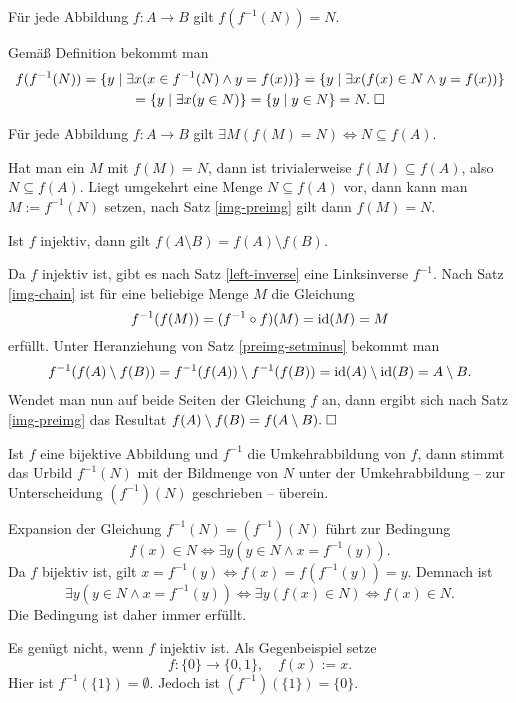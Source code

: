 \begin{Satz}\label{img-preimg}
Für jede Abbildung $f\colon A\to B$ gilt $f(f^{-1}(N))=N$.
\end{Satz}
\begin{Beweis}
Gemäß Definition bekommt man
\begin{gather*}
f(f^{-1}(N))
= \{y\mid \exists x(x\in f^{-1}(N)\land y=f(x))\}
= \{y\mid \exists x(f(x)\in N\land y=f(x))\}\\
= \{y\mid \exists x(y\in N)\} = \{y\mid y\in N\} = N.\;\square
\end{gather*}
\end{Beweis}

\begin{Satz}
Für jede Abbildung $f\colon A\to B$ gilt
$\exists M(f(M)=N)\iff N\subseteq f(A)$.
\end{Satz}
\begin{Beweis}
Hat man ein $M$ mit $f(M)=N$, dann ist trivialerweise
$f(M)\subseteq f(A)$, also $N\subseteq f(A)$. Liegt umgekehrt
eine Menge $N\subseteq f(A)$ vor, dann kann man $M:=f^{-1}(N)$
setzen, nach Satz \ref{img-preimg} gilt dann $f(M)=N$.\;\qedsymbol
\end{Beweis}

\begin{Satz}\label{inj-img-setminus}
Ist $f$ injektiv, dann gilt $f(A\setminus B)=f(A)\setminus f(B)$.
\end{Satz}
\begin{Beweis}
Da $f$ injektiv ist, gibt es nach Satz \ref{left-inverse} eine
Linksinverse $f^{-1}$. Nach Satz \ref{img-chain} ist für eine
beliebige Menge $M$ die Gleichung
\[f^{-1}(f(M)) = (f^{-1}\circ f)(M) = \operatorname{id}(M) = M\]
erfüllt. Unter Heranziehung von Satz \ref{preimg-setminus}
bekommt man
\begin{gather*}
f^{-1}(f(A)\setminus f(B)) = f^{-1}(f(A))\setminus f^{-1}(f(B))
= \operatorname{id}(A)\setminus\operatorname{id}(B) = A\setminus B.
\end{gather*}
Wendet man nun auf beide Seiten der Gleichung $f$ an, dann ergibt
sich nach Satz \ref{img-preimg} das Resultat
$f(A)\setminus f(B) = f(A\setminus B).\;\square$
\end{Beweis}

\begin{Satz}
Ist $f$ eine bijektive Abbildung und $f^{-1}$ die Umkehrabbildung
von $f$, dann stimmt das Urbild $f^{-1}(N)$ mit der Bildmenge
von $N$ unter der Umkehrabbildung -- zur Unterscheidung $(f^{-1})(N)$
geschrieben -- überein.
\end{Satz}
\begin{Beweis}
Expansion der Gleichung $f^{-1}(N)=(f^{-1})(N)$ führt zur Bedingung
\[f(x)\in N\iff \exists y(y\in N\land x=f^{-1}(y)).\]
Da $f$ bijektiv ist, gilt $x=f^{-1}(y)\iff f(x)=f(f^{-1}(y))=y$.
Demnach ist
\[\exists y(y\in N\land x=f^{-1}(y))\iff \exists y(f(x)\in N)\iff f(x)\in N.\]
Die Bedingung ist daher immer erfüllt.\;\qedsymbol
\end{Beweis}
Es genügt nicht, wenn $f$ injektiv ist. Als Gegenbeispiel setze
\[f\colon\{0\}\to\{0,1\},\quad f(x):=x.\]
Hier ist $f^{-1}(\{1\})=\emptyset$. Jedoch ist
$(f^{-1})(\{1\})=\{0\}$.

